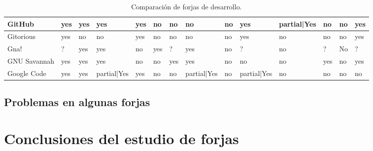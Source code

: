 \begin{landscape}
\begin{table}[H]
{\begin{tabular}{|l|l|l|l|l|l|l|l|l|l|l|l|l|l|}
    \hline GitHub & yes & yes & yes & yes & no & no & no & no & yes & partial|Yes & no & no & yes\\

    \hline Gitorious & yes & no & no & yes & no & no & no & no & yes & no & no & no & yes\\

    \hline Gna! & ?& yes& yes& no& yes& ?& yes& no& ?& no& ?& No& ?\\ 

    \hline GNU Savannah & yes & yes & yes & no & no & yes & yes & no & no & no & yes & no & yes\\

    \hline Google Code & yes & yes & partial|Yes & yes & no & no & partial|Yes & no & partial|Yes & no & no & no & no\\

    \hline
\end{tabular}
}
\caption{Comparación de forjas de desarrollo.}
\label{tabla_compartiva}

\end{table}

\end{landscape}


\subsection{Problemas en algunas forjas}
\label{sub:problemas}


\section{Conclusiones del estudio de forjas}
\label{sec:conclusiones}

